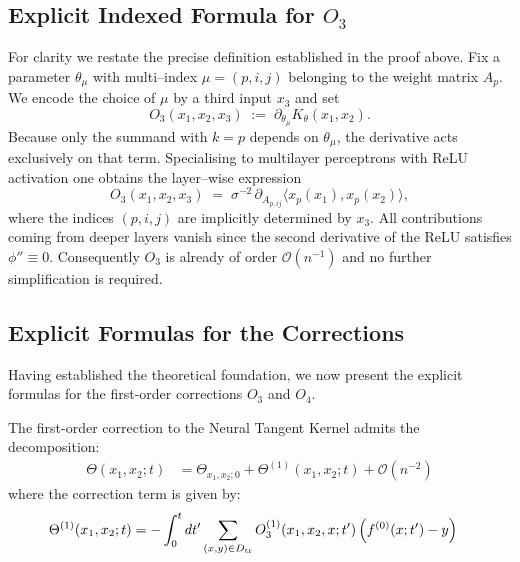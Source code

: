 \documentclass[a4paper]{article}
\begin{document}
\subsection{Explicit Indexed Formula for $O_3$}
For clarity we restate the precise definition established in the proof above.  
Fix a parameter $\theta_{\mu}$ with multi--index $\mu=(p,i,j)$ belonging to the weight matrix $A_p$.  We encode the choice of $\mu$ by a third input $x_3$ and set
\[
  O_3(x_1,x_2,x_3)\;:=\;\partial_{\theta_{\mu}}K_{\theta}(x_1,x_2).
\]
Because only the summand with $k=p$ depends on $\theta_{\mu}$, the derivative acts exclusively on that term.  Specialising to multilayer perceptrons with ReLU activation one obtains the layer–wise expression
\begin{equation}\label{eq:O3layer}
  O_3(x_1,x_2,x_3)\;=\;\sigma^{-2}\,\partial_{A_{p,ij}}\bigl\langle x_p(x_1),x_p(x_2)\bigr\rangle,
\end{equation}
where the indices $(p,i,j)$ are implicitly determined by $x_3$.  All contributions coming from deeper layers vanish since the second derivative of the ReLU satisfies $\phi''\equiv 0$.  Consequently $O_3$ is already of order $\mathcal{O}(n^{-1})$ and no further simplification is required.

\subsection{Explicit Formulas for the Corrections}

Having established the theoretical foundation, we now present the explicit formulas for the first-order corrections $O_3$ and $O_4$.

\begin{theorem}\label{thm:corrections}
The first-order correction to the Neural Tangent Kernel admits the decomposition:
\begin{align}
\Theta(x_1,x_2;t) &= \Theta_{x_1,x_2;0} + \Theta^{(1)}(x_1,x_2;t) + \mathcal{O}(n^{-2}) \label{eq:theta_expansion}
\end{align}
where the correction term is given by:
\begin{align}
\Theta^{(1)}(x_1,x_2;t) &= -\int_{0}^{t}dt'\sum_{(x,y)\in D_{\rm tr}}O^{(1)}_{3}(x_1,x_2,x;t')\left(f^{(0)}(x;t')-y\right) \label{eq:theta_correction}
\end{align}
\end{theorem}
\end{document}

